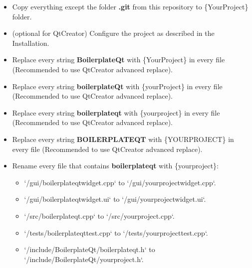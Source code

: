 \begin{itemize}
  \item
        Copy everything except the folder \textbf{.git} from this repository
        to \{YourProject\} folder.
\end{itemize}

\begin{itemize}
  \item
        (optional for QtCreator) Configure the project as described in the
        Installation.
\end{itemize}

\begin{itemize}
  \item
        Replace every string \textbf{BoilerplateQt} with \{YourProject\} in
        every file (Recommended to use QtCreator advanced replace).
\end{itemize}

\begin{itemize}
  \item
        Replace every string \textbf{boilerplateQt} with \{yourProject\} in
        every file (Recommended to use QtCreator advanced replace).
\end{itemize}

\begin{itemize}
  \item
        Replace every string \textbf{boilerplateqt} with \{yourproject\} in
        every file (Recommended to use QtCreator advanced replace).
\end{itemize}

\begin{itemize}
  \item
        Replace every string \textbf{BOILERPLATEQT} with \{YOURPROJECT\} in
        every file (Recommended to use QtCreator advanced replace).
\end{itemize}

\begin{itemize}
  \item
        Rename every file that contains \textbf{boilerplateqt} with
        \{yourproject\}:
        \begin{itemize}
          \item
                `/gui/boilerplateqtwidget.cpp` to `/gui/{yourproject}widget.cpp`.

          \item
                `/gui/boilerplateqtwidget.ui` to `/gui/{yourproject}widget.ui`.

          \item
                `/src/boilerplateqt.cpp` to `/src/{yourproject}.cpp`.

          \item
                `/tests/boilerplateqttest.cpp` to `/tests/{yourproject}test.cpp`.

          \item
                `/include/BoilerplateQt/boilerplateqt.h` to `/include/BoilerplateQt/{yourproject}.h`.
        \end{itemize}
\end{itemize}



